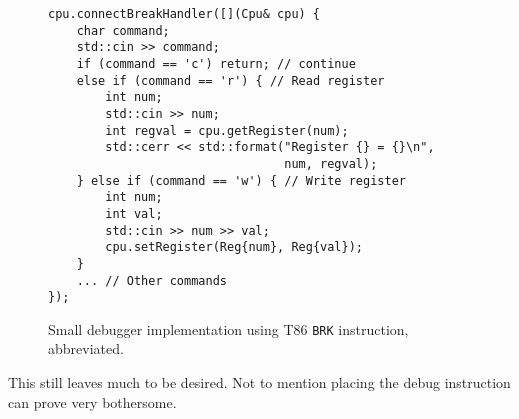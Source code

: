 \begin{figure}
    \begin{verbatim}
cpu.connectBreakHandler([](Cpu& cpu) {
    char command;
    std::cin >> command;
    if (command == 'c') return; // continue
    else if (command == 'r') { // Read register
        int num;
        std::cin >> num;
        int regval = cpu.getRegister(num);
        std::cerr << std::format("Register {} = {}\n",
                                 num, regval);
    } else if (command == 'w') { // Write register
        int num;
        int val;
        std::cin >> num >> val;
        cpu.setRegister(Reg{num}, Reg{val});
    }
    ... // Other commands
});
    \end{verbatim}
    \caption{Small debugger implementation using T86 \texttt{BRK} instruction,
    abbreviated.}
    \label{fig:t86-pocket-debugger}
\end{figure}

This still leaves much to be desired. Not to mention placing the debug
instruction can prove very bothersome.
